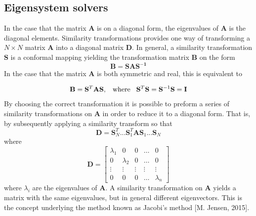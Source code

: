 \documentclass[%
reprint,
amsmath, 
amssymb, 
aps,]{revtex4-1}
\begin{document}
		\subsection{Eigensystem solvers} \noindent 
In the case that the matrix $\mathbf{A}$ is on a diagonal form, the eigenvalues of $\mathbf{A}$ is the diagonal elements. Similarity transformations provides one way of transforming a $N\times N$ matrix $\mathbf{A}$ into a diagonal matrix $\mathbf{D}$. In general, a similarity transformation $\mathbf{S}$ is a conformal mapping yielding the transformation matrix $\mathbf{B}$ on the form
			\begin{equation*}
	\mathbf{B} = \mathbf{SAS^{-1}}
			\end{equation*}
\noindent In the case that the matrix $\mathbf{A}$ is both symmetric and real, this is equivalent to  

			\begin{equation*} \label{eq2}
\mathbf{B} = \mathbf{S}^T\mathbf{A}\mathbf{S}, \hspace{3mm} \textnormal{where} \hspace{3mm} \mathbf{S}^T\mathbf{S} = \mathbf{S}^{-1}\mathbf{S} = \mathbf{I}
			\end{equation*}
By choosing the correct transformation it is possible to preform a series of similarity transformations on $\mathbf{A}$ in order to reduce it to a diagonal form. That is, by subsequently applying a similarity transform so that 
			\begin{equation*}
\mathbf{D} = \mathbf{S}_N^T...\mathbf{S}_1^T\mathbf{A}\mathbf{S}_1...\mathbf{S}_N 
			\end{equation*}
where 
			\begin{equation*}
	\mathbf{D} = \begin{bmatrix}
	\lambda_1 & 0 & 0 & \dots & 0 \\
	0 & \lambda_2 & 0 & \dots & 0 \\
	\vdots & \vdots & \vdots &\vdots&\vdots\\
	0 & 0 & 0 &\dots & \lambda_n
	\end{bmatrix}
			\end{equation*}
where $\lambda_i$ are the eigenvalues of $\mathbf{A}$. A similarity transformation on $\mathbf{A}$ yields a matrix with the same eigenvalues, but in general different eigenvectors. This is the concept underlying the method known as Jacobi's method [M. Jensen, 2015].
\end{document}
